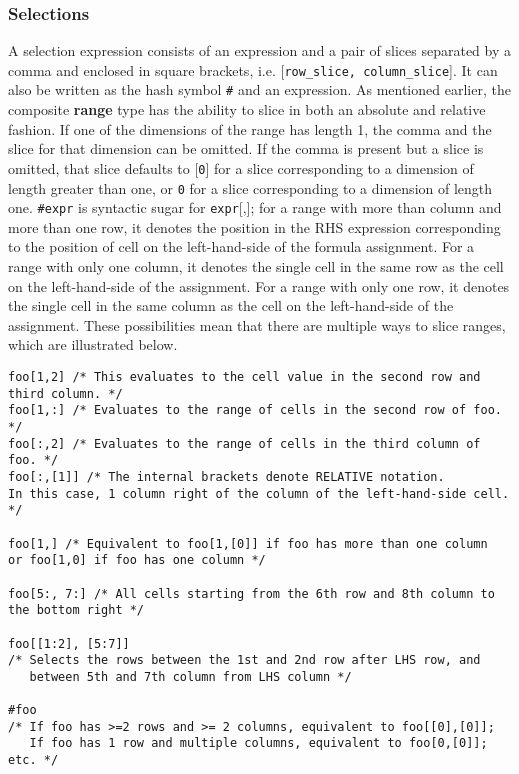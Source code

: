 \subsubsection{Selections}
A selection expression consists of an expression and a pair of slices separated by a comma and enclosed in square brackets, i.e. {[}\texttt{row\_slice, column\_slice}{]}. It can also be written as the hash symbol \texttt{\#} and an expression. As mentioned earlier, the composite \textbf{range} type has the ability to slice in both an absolute and relative fashion. If one of the dimensions of the range has length 1, the comma and the slice for that dimension can be omitted. If the comma is present but a slice is omitted, that slice defaults to {[}\texttt{0}{]} for a slice corresponding to a dimension of length greater than one, or \texttt{0} for a slice corresponding to a dimension of length one. \texttt{\#expr} is syntactic sugar for \texttt{expr}{[},{]}; for a range with more than column and more than one row, it denotes the position in the RHS expression corresponding to the position of cell on the left-hand-side of the formula assignment. For a range with only one column, it denotes the single cell in the same row as the cell on the left-hand-side of the assignment. For a range with only one row, it denotes the single cell in the same column as the cell on the left-hand-side of the assignment. These possibilities mean that there are multiple ways to slice ranges, which are illustrated below.\newline
\begin{lstlisting}
foo[1,2] /* This evaluates to the cell value in the second row and third column. */
foo[1,:] /* Evaluates to the range of cells in the second row of foo. */
foo[:,2] /* Evaluates to the range of cells in the third column of foo. */
foo[:,[1]] /* The internal brackets denote RELATIVE notation.
In this case, 1 column right of the column of the left-hand-side cell. */

foo[1,] /* Equivalent to foo[1,[0]] if foo has more than one column
or foo[1,0] if foo has one column */

foo[5:, 7:] /* All cells starting from the 6th row and 8th column to the bottom right */

foo[[1:2], [5:7]]
/* Selects the rows between the 1st and 2nd row after LHS row, and
   between 5th and 7th column from LHS column */

#foo
/* If foo has >=2 rows and >= 2 columns, equivalent to foo[[0],[0]];
   If foo has 1 row and multiple columns, equivalent to foo[0,[0]]; etc. */
\end{lstlisting}
